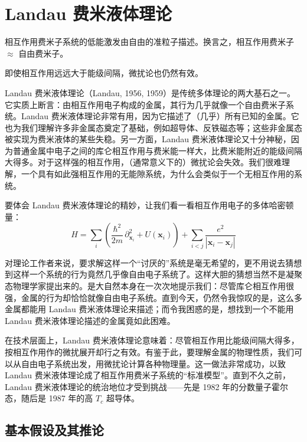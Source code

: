 \section{Landau 费米液体理论}

\begin{keypoints}
\item 相互作用费米子系统的低能激发由自由的准粒子描述。换言之，相互作用费米子 $\approx$ 自由费米子。
\item 即使相互作用远远大于能级间隔，微扰论也仍然有效。
\end{keypoints}

Landau 费米液体理论（Landau, 1956, 1959）是传统多体理论的两大基石之一。它实质上断言：由相互作用电子构成的金属，其行为几乎就像一个自由费米子系统。Landau 费米液体理论非常有用，因为它描述了（几乎）所有已知的金属。它也为我们理解许多非金属态奠定了基础，例如超导体、反铁磁态等；这些非金属态被实现为费米液体的某些失稳。另一方面，Landau 费米液体理论又十分神秘，因为普通金属中电子之间的库仑相互作用与费米能一样大，比费米能附近的能级间隔大得多。对于这样强的相互作用，（通常意义下的）微扰论会失效。我们很难理解，一个具有如此强相互作用的无能隙系统，为什么会类似于一个无相互作用的系统。

要体会 Landau 费米液体理论的精妙，让我们看一看相互作用电子的多体哈密顿量：
\begin{equation*}
H = \sum_{i} \left( \frac{\hbar^{2}}{2m}\, \partial^{2}_{\pmb{x}_i} + U(\pmb{x}_i) \right) + \sum_{i<j} \frac{e^{2}}{|\pmb{x}_i - \pmb{x}_j|}
\end{equation*}

对理论工作者来说，要求解这样一个“讨厌的”系统是毫无希望的，更不用说去猜想到这样一个系统的行为竟然几乎像自由电子系统了。这样大胆的猜想当然不是凝聚态物理学家提出来的。是大自然本身在一次次地提示我们：尽管库仑相互作用很强，金属的行为却恰恰就像自由电子系统。直到今天，仍然令我惊叹的是，这么多金属都能用 Landau 费米液体理论来描述；而令我困惑的是，想找到一个不能用 Landau 费米液体理论描述的金属竟如此困难。

在技术层面上，Landau 费米液体理论意味着：尽管相互作用比能级间隔大得多，按相互作用作的微扰展开却行之有效。有鉴于此，要理解金属的物理性质，我们可以从自由电子系统出发，用微扰论计算各种物理量。这一做法非常成功，以致 Landau 费米液体理论成了相互作用费米子系统的“标准模型”。直到不久之前，Landau 费米液体理论的统治地位才受到挑战——先是 1982 年的分数量子霍尔态，随后是 1987 年的高 $T_c$ 超导体。

\subsection{基本假设及其推论}

